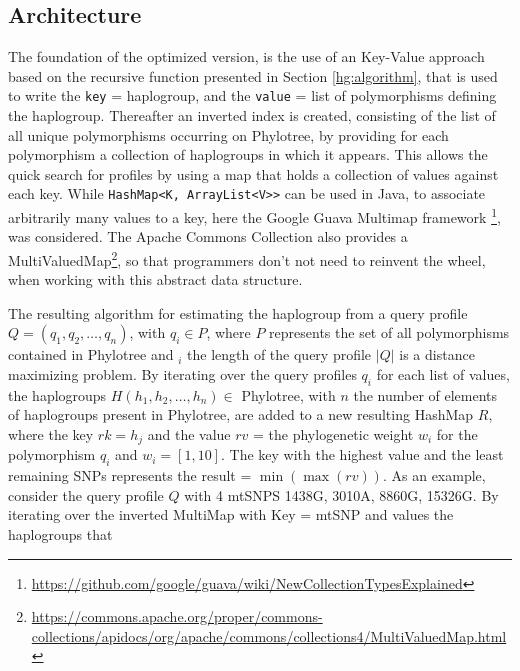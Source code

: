 \subsection{Architecture}
The foundation of the optimized version, is the use of an Key-Value approach based on the recursive function presented in Section \ref{hg:algorithm}, that is used to write the \texttt{key} = haplogroup, and the \texttt{value} = list of polymorphisms defining the haplogroup. Thereafter an inverted index is created, consisting of the list of all unique polymorphisms occurring on Phylotree, by providing for each polymorphism a collection of haplogroups in which it appears. This allows the quick search for profiles by using a map that holds a collection of values against each key. While \texttt{HashMap<K, ArrayList<V>>} can be used in Java, to associate arbitrarily many values to a key, here the Google Guava Multimap framework \footnote{\url{https://github.com/google/guava/wiki/NewCollectionTypesExplained}}, was considered. The Apache Commons Collection also provides a MultiValuedMap\footnote{\url{https://commons.apache.org/proper/commons-collections/apidocs/org/apache/commons/collections4/MultiValuedMap.html}}, so that programmers don't not need to reinvent the wheel, when working with this abstract data structure.

The resulting algorithm for estimating the haplogroup from a query profile $Q  = \left(q_1,q_2,\dotsc,q_n\right)$, with $q_i \in P$, where $P$ represents the set of all polymorphisms contained in Phylotree and $_i$ the length of the query profile $|Q|$ is a distance maximizing problem. By iterating over the query profiles $q_i$ for each list of values, the haplogroups $H \left(h_1,h_2,\dotsc,h_n\right) \in$ Phylotree, with $n$ the number of elements of haplogroups present in Phylotree, are added to a new resulting HashMap $R$, where the key $rk = h_j$ and the value $rv$ = the phylogenetic weight $w_i$ for the polymorphism $q_i$ and $w_i = \left[1, 10\right]$. The key with the highest value and the least remaining SNPs represents the result = $ \min\left(\max\left(rv\right)\right)$. 
As an example, consider the query profile $Q$ with 4 mtSNPS  1438G, 3010A, 8860G, 15326G. By iterating over the inverted MultiMap with Key = mtSNP and values the haplogroups that 

